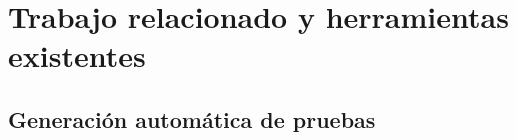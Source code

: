 %
\chapter{Trabajo relacionado y herramientas existentes}
\label{chapter2}

\section{Generación automática de pruebas}



